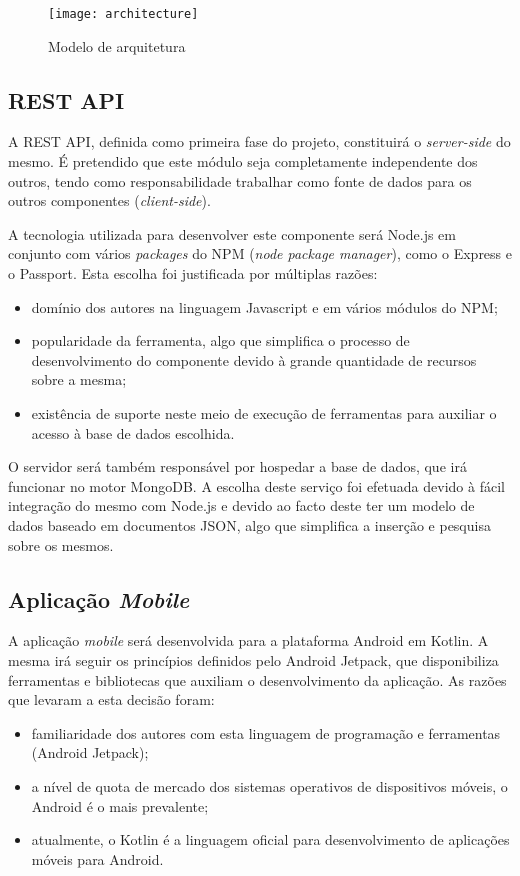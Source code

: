 \begin{figure}[h]
	\centering
	\texttt{[image: architecture]}
	\caption{Modelo de arquitetura}
\end{figure}


\subsection{REST API}
A REST API, definida como primeira fase do projeto, constituirá o \textit{server-side} do mesmo. É pretendido que este módulo seja completamente independente dos outros, tendo como responsabilidade trabalhar como fonte de dados para os outros componentes (\textit{client-side}). \par \medskip 

A tecnologia utilizada para desenvolver este componente será Node.js em conjunto com vários \textit{packages} do NPM (\textit{node package manager}), como o Express e o Passport. Esta escolha foi justificada por múltiplas razões:
\begin{itemize}
	\item domínio dos autores na linguagem Javascript e em vários módulos do NPM;
	\item popularidade da ferramenta, algo que simplifica o processo de desenvolvimento do componente devido à grande quantidade de recursos sobre a mesma;
	\item existência de suporte neste meio de execução de ferramentas para auxiliar o acesso à base de dados escolhida.
\end{itemize}
\par \medskip

O servidor será também responsável por hospedar a base de dados, que irá funcionar no motor MongoDB. A escolha deste serviço foi efetuada devido à fácil integração do mesmo com Node.js e devido ao facto deste ter um modelo de dados baseado em documentos JSON, algo que simplifica a inserção e pesquisa sobre os mesmos.
\par \medskip

\subsection{Aplicação \textit{Mobile}}
A aplicação \textit{mobile} será desenvolvida para a plataforma Android em Kotlin. A mesma irá seguir os princípios definidos pelo Android Jetpack, que disponibiliza ferramentas e bibliotecas que auxiliam o desenvolvimento da aplicação. As razões que levaram a esta decisão foram:
\begin{itemize}
	\item familiaridade dos autores com esta linguagem de programação e ferramentas (Android Jetpack);
	\item a nível de quota de mercado dos sistemas operativos de dispositivos móveis, o Android é o mais prevalente;
	\item atualmente, o Kotlin é a linguagem oficial para desenvolvimento de aplicações móveis para Android.
\end{itemize}

